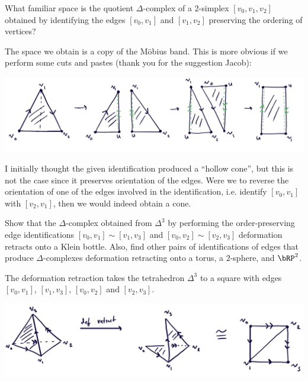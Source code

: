 \begin{homework}[e]
  \prob[2.1.1] What familiar space is the quotient $\Delta$-complex of a 2-simplex $[v_0, v_1,v_2]$ obtained by identifying the edges $[v_0,v_1]$ and $[v_1,v_2]$ preserving the ordering of vertices?
  \begin{prf}
    The space we obtain is a copy of the M\"obius band. This is more obvious if we perform some cuts and pastes (thank you for the suggestion Jacob): 
    \begin{center}
      \includegraphics[width=14cm]{figures/hwk7-fig4.png}
      \label{fig:prob2-4}
    \end{center}
    I initially thought the given identification produced a ``hollow cone'', but this is not the case since it preserves orientation of the edges. Were we to reverse the orientation of one of the edges involved in the identification, i.e. identify $[v_0,v_1]$ with $[v_2,v_1]$, then we would indeed obtain a cone.
  \end{prf}
  \prob[2.1.2] Show that the $\Delta$-complex obtained from $\Delta^3$ by performing the order-preserving edge identifications $[v_0,v_1]\sim [v_1,v_3]$ and $[v_0,v_2]\sim [v_2,v_3]$ deformation retracts onto a Klein bottle. Also, find other pairs of identifications of edges that produce $\Delta$-complexes deformation retracting onto a torus, a $2$-sphere, and $\bRP^2$.
  \begin{prf}
    The deformation retraction takes the tetrahedron $\Delta^3$ to a square with edges $[v_0,v_1]$, $[v_1,v_3]$, $[v_0,v_2]$ and $[v_2,v_3]$. 
    \begin{center}
      \includegraphics[width=14cm]{figures/hwk7-fig1.png}

\end{center}
\end{prf}
\end{homework}
